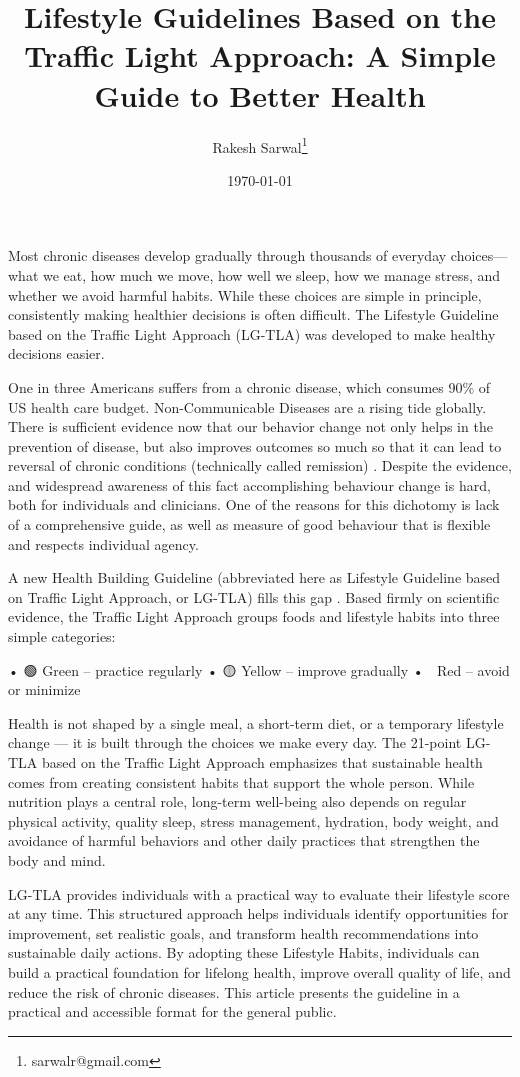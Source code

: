 \documentclass{article}
\author{Rakesh Sarwal\thanks{sarwalr@gmail.com}}
\date{\today}
\title{Lifestyle Guidelines Based on the Traffic Light Approach: A Simple Guide to Better Health}
\begin{document}
\maketitle
Most chronic diseases develop gradually through thousands of everyday choices—what we eat, how much we move, how well we sleep, how we manage stress, and whether we avoid harmful habits. While these choices are simple in principle, consistently making healthier decisions is often difficult.  The Lifestyle Guideline based on the Traffic Light Approach (LG-TLA) was developed to make healthy decisions easier.

One in three Americans suffers from a chronic disease, which consumes 90\% of US health care budget. Non-Communicable Diseases are a rising tide globally. \cite{WHO2023NCD}  There is sufficient evidence now that our behavior change not only helps in the  prevention of disease, but also improves outcomes so much so that it can lead to reversal of chronic conditions (technically called remission) \cite{Katz2014Lifestyle} \cite{LloydJones2022LE8}  . Despite the evidence, and widespread awareness of this fact accomplishing behaviour change is hard, both for individuals and clinicians. One of the reasons for this dichotomy is lack of a comprehensive guide, as well as measure of good behaviour that is flexible and respects individual agency.

A new Health Building Guideline (abbreviated here as Lifestyle Guideline based on Traffic Light Approach, or LG-TLA) fills this gap \cite{Sarwal2026}. Based firmly on scientific evidence, the Traffic Light Approach groups foods and lifestyle habits into three simple categories:

• 🟢 Green – practice regularly
• 🟡 Yellow – improve gradually
• 🔴 Red – avoid or minimize

Health is not shaped by a single meal, a short-term diet, or a temporary lifestyle change — it is built through the choices we make every day. The 21-point LG-TLA based on the Traffic Light Approach emphasizes that sustainable health comes from creating consistent habits that support the whole person. While nutrition plays a central role, long-term well-being also depends on regular physical activity, quality sleep, stress management, hydration, body weight, and avoidance of harmful behaviors and other daily practices that strengthen the body and mind.

LG-TLA provides individuals with a practical way to evaluate their lifestyle score at any time. This structured approach helps individuals identify opportunities for improvement, set realistic goals, and transform health recommendations into sustainable daily actions. By adopting these Lifestyle Habits, individuals can build a practical foundation for lifelong health, improve overall quality of life, and reduce the risk of chronic diseases. This article presents the guideline in a practical and accessible format for the general public.
\end{document}
